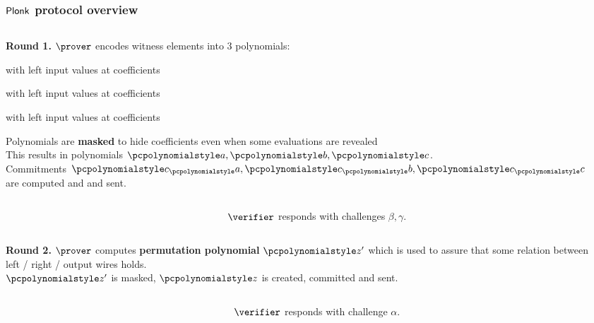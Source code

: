 \documentclass[aspectratio=169,handout]{beamer}
\renewcommand{\emph}[1]{\textbf{#1}}
\begin{document}
\begin{frame}
  \frametitle{$\textnormal{\textsf{Plonk}}$ protocol overview}
  \begin{columns}
    \begin{column}{0.5\linewidth}
      \textbf{Round 1.} $\prover$ encodes witness elements into $3$ polynomials:
      \begin{compactitem}
      \item {} with left input values at coefficients
      \item {} with left input values at coefficients
      \item {} with left input values at coefficients
      \end{compactitem}
      Polynomials are \emph{masked} to hide coefficients even when some
      evaluations are revealed\\
      This results in polynomials $\p{a}, \p{b}, \p{c}$. \\
      Commitments $\cp{a}, \cp{b}, \cp{c}$ are computed and and sent.
  \end{column}
    \begin{column}{0.5\linewidth}
    \end{column}
  \end{columns}
  \begin{columns}
    \begin{column}{0.5\linewidth}
    \end{column}
    \begin{column}{0.5\linewidth}
      $\verifier$ responds with challenges $\beta, \gamma$.
    \end{column}
  \end{columns}
    \begin{columns}
    \begin{column}{0.5\linewidth}
      \textbf{Round 2.} $\prover$ computes \emph{permutation polynomial}
      $\p{z'}$ which is used to assure that some relation between left / right /
      output wires holds.\\
      $\p{z'}$ is masked, $\p{z}$ is created, committed and sent.
    \end{column}
    \begin{column}{0.5\linewidth}
    \end{column}
  \end{columns}
      \begin{columns}
      \begin{column}{0.5\linewidth}
    \end{column}
    \begin{column}{0.5\linewidth}
      $\verifier$ responds with challenge $\alpha$.
    \end{column}
  \end{columns}

\end{frame}
\end{document}
